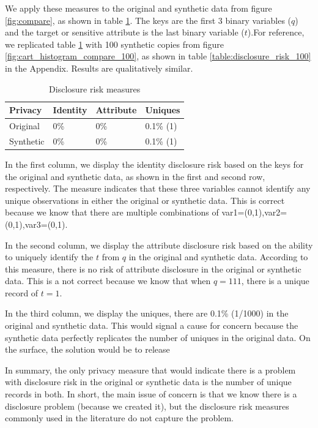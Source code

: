 \documentclass[runningheads]{llncs}
\begin{document}
We apply these measures to the original and synthetic data from figure \ref{fig:compare}, as shown in table \ref{table:disclosure_risk}.  The keys are the first 3 binary variables ($q$) and the target or sensitive attribute is the last binary variable ($t$).For reference, we replicated table \ref{table:disclosure_risk} with 100 synthetic copies from figure \ref{fig:cart_histogram_compare_100}, as shown in table \ref{table:disclosure_risk_100} in the Appendix.  Results are qualitatively similar.  

\begin{table}[]
    \centering
    \caption{Disclosure risk measures}
    \begin{tabular}{llll}
        \toprule
        Privacy   & Identity & Attribute & Uniques \\ \midrule
        Original  & 0\%      & 0\%       & 0.1\% (1) \\
        Synthetic & 0\%      & 0\%       & 0.1\% (1) \\ 
        \bottomrule
    \end{tabular}
    \label{table:disclosure_risk}
\end{table}

In the first column, we display the identity disclosure risk based on the keys for the original and synthetic data, as shown in the first and second row, respectively.  The measure indicates that these three variables cannot identify any unique observations in either the original or synthetic data.  This is correct because we know that there are multiple combinations of var1=(0,1),var2=(0,1),var3=(0,1).  

In the second column, we display the attribute disclosure risk based on the ability to uniquely identify the $t$ from $q$ in the original and synthetic data.  According to this measure, there is no risk of attribute disclosure in the original or synthetic data.  This is a not correct because we know that when $q=111$, there is a unique record of $t=1$.  

In the third column, we display the uniques, there are 0.1\% (1/1000) in the original and synthetic data.  This would signal a cause for concern because the synthetic data perfectly replicates the number of uniques in the original data.  On the surface, the solution would be to release 

In summary, the only privacy measure that would indicate there is a problem with disclosure risk in the original or synthetic data is the number of unique records in both.  In short, the main issue of concern is that we know there is a disclosure problem (because we created it), but the disclosure risk measures commonly used in the literature do not capture the problem.  
\end{document}
